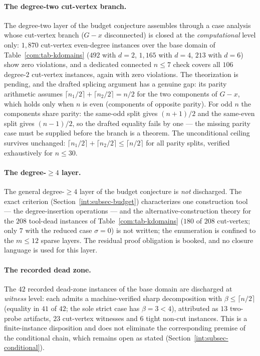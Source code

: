 \paragraph{The degree-two cut-vertex branch.} The degree-two layer of the
budget conjecture assembles through a case analysis whose cut-vertex
branch ($G-x$ disconnected) is closed at the \emph{computational} level
only: $1{,}870$ cut-vertex even-degree instances over the base domain of
Table~\ref{com:tab-kdomains} ($492$ with $d=2$, $1{,}165$ with $d=4$,
$213$ with $d=6$) show zero violations, and a dedicated connected
$n\le7$ check covers all $106$ degree-$2$ cut-vertex instances, again
with zero violations. The theorization is pending, and the drafted
splicing argument has a genuine gap: its parity arithmetic assumes
$\lceil n_1/2\rceil+\lceil n_2/2\rceil=n/2$ for the two components of
$G-x$, which holds only when $n$ is even (components of opposite
parity). For odd $n$ the components share parity: the same-odd split
gives $(n+1)/2$ and the same-even split gives $(n-1)/2$, so the drafted
equality fails by one --- the missing parity case must be supplied
before the branch is a theorem. The unconditional ceiling survives
unchanged: $\lceil n_1/2\rceil+\lceil n_2/2\rceil\le\lceil n/2\rceil$
for all parity splits, verified exhaustively for $n\le30$.

\paragraph{The degree-$\ge4$ layer.} The general degree-$\ge4$ layer of
the budget conjecture is \emph{not} discharged. The exact criterion
(Section~\ref{int:subsec-budget}) characterizes one construction tool ---
the degree-insertion operations --- and the alternative-construction
theory for the $208$ tool-dead instances of
Table~\ref{com:tab-kdomains} ($180$ of $208$ cut-vertex; only $7$ with
the reduced case $\sigma=0$) is not written; the enumeration is confined
to the $m\le12$ sparse layers. The residual proof obligation is booked,
and no closure language is used for this layer.

\paragraph{The recorded dead zone.} The $42$ recorded dead-zone instances
of the base domain are discharged at \emph{witness} level: each admits a
machine-verified sharp decomposition with $\beta\le\lceil n/2\rceil$
(equality in $41$ of $42$; the sole strict case has $\beta=3<4$),
attributed as $13$ two-probe artifacts, $23$ cut-vertex witnesses and $6$
tight non-cut instances. This is a finite-instance disposition and does
not eliminate the corresponding premise of the conditional chain, which
remains open as stated (Section~\ref{int:subsec-conditional}).

